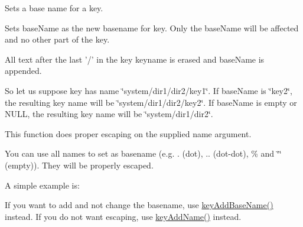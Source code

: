 Sets a base name for a key. 

Sets {\ttfamily base\-Name} as the new basename for {\ttfamily key}.  Only the base\-Name will be affected and no other part of the key.

All text after the last {\ttfamily '/'} in the {\ttfamily key} keyname is erased and {\ttfamily base\-Name} is appended.

So let us suppose {\ttfamily key} has name {\ttfamily \char`\"{}system/dir1/dir2/key1\char`\"{}}. If {\ttfamily base\-Name} is {\ttfamily \char`\"{}key2\char`\"{}}, the resulting key name will be {\ttfamily \char`\"{}system/dir1/dir2/key2\char`\"{}}. If {\ttfamily base\-Name} is empty or N\-U\-L\-L, the resulting key name will be {\ttfamily \char`\"{}system/dir1/dir2\char`\"{}}.

This function does proper escaping on the supplied name argument.

You can use all names to set as basename (e.\-g. . (dot), .. (dot-\/dot), \% and \char`\"{}\char`\"{} (empty)). They will be properly escaped.

A simple example is\-: 
 If you want to add and not change the basename, use \hyperlink{group__keyname_gaa942091fc4bd5c2699e49ddc50829524}{key\-Add\-Base\-Name()} instead. If you do not want escaping, use \hyperlink{group__keyname_gaa70593a2c772c4b7bc33423b9b10a270}{key\-Add\-Name()} instead.


